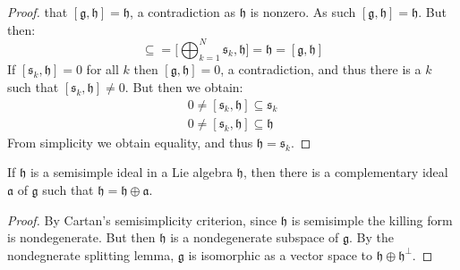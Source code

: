 \begin{proof}
        that $[\mathfrak{g},\mathfrak{h}]=\mathfrak{h}$, a contradiction as
        $\mathfrak{h}$ is nonzero. As such
        $[\mathfrak{g},\mathfrak{h}]=\mathfrak{h}$. But then:
        \begin{equation}
            [\mathfrak{s}_{k},\mathfrak{h}]\subseteq
            =\Big[\bigoplus_{k=1}^{N}\mathfrak{s}_{k},\mathfrak{h}\Big]
            =\mathfrak{h}=[\mathfrak{g},\mathfrak{h}]
        \end{equation}
        If $[\mathfrak{s}_{k},\mathfrak{h}]=0$ for all $k$ then
        $[\mathfrak{g},\mathfrak{h}]=0$, a contradiction, and thus there
        is a $k$ such that $[\mathfrak{s}_{k},\mathfrak{h}]\ne{0}$. But then
        we obtain:
        \begin{align}
            0\ne[\mathfrak{s}_{k},\mathfrak{h}]\subseteq\mathfrak{s}_{k}\\
            0\ne[\mathfrak{s}_{k},\mathfrak{h}]\subseteq\mathfrak{h}
        \end{align}
        From simplicity we obtain equality, and thus
        $\mathfrak{h}=\mathfrak{s}_{k}$.
    \end{proof}
    \begin{theorem}
        If $\mathfrak{h}$ is a semisimple ideal in a Lie algebra
        $\mathfrak{h}$, then there is a complementary ideal $\mathfrak{a}$
        of $\mathfrak{g}$ such that
        $\mathfrak{h}=\mathfrak{h}\oplus\mathfrak{a}$.
    \end{theorem}
    \begin{proof}
        By Cartan's semisimplicity criterion, since $\mathfrak{h}$ is
        semisimple the killing form is nondegenerate. But then
        $\mathfrak{h}$ is a nondegenerate subspace of $\mathfrak{g}$. By
        the nondegnerate splitting lemma, $\mathfrak{g}$ is isomorphic as
        a vector space to $\mathfrak{h}\oplus\mathfrak{h}^{\perp}$.
    \end{proof}
